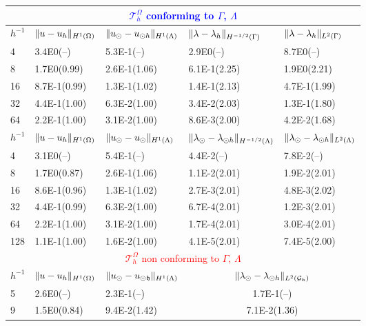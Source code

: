\documentclass[r]{siamart171218}
\begin{document}
\begin{table}
  \scriptsize{
  \begin{center}
    \begin{tabular}{l|llll}
\hline
\multicolumn{5}{c}{\textcolor{blue}{$\mathcal{T}^{\Omega}_h$ conforming to $\Gamma$, $\Lambda$}}\\
\hline
    $h^{-1}$ & $\lVert{u-u_h}\rVert_{H^1(\Omega)}$ & $\lVert{u_{\odot}-u_{\odot h}}\rVert_{H^1(\Lambda)}$ & $\lVert{\lambda-\lambda_h}\rVert_{H^{-1/2}(\Gamma)}$ & $\lVert{\lambda-\lambda_h}\rVert_{L^2(\Gamma)}$\\
      \hline
4  & 3.4E0(--)    & 5.3E-1(--)   & 2.9E0(--)    &8.7E0(--)    \\
8  & 1.7E0(0.99)  & 2.6E-1(1.06) & 6.1E-1(2.25) &1.9E0(2.21)  \\
16 & 8.7E-1(0.99) & 1.3E-1(1.02) & 1.4E-1(2.13) &4.7E-1(1.99) \\
32 & 4.4E-1(1.00) & 6.3E-2(1.00) & 3.4E-2(2.03) &1.3E-1(1.80) \\
64 & 2.2E-1(1.00) & 3.1E-2(1.00) & 8.6E-3(2.00) &4.2E-2(1.68) \\
\hline
$h^{-1}$ & $\lVert{u-u_h}\rVert_{H^1(\Omega)}$ & $\lVert{u_{\odot}-u_{\odot}}\rVert_{H^1(\Lambda)}$ & $\lVert{\lambda_{\odot}-\lambda_{\odot h}}\rVert_{H^{-1/2}(\Lambda)}$ & $\lVert{\lambda_{\odot}-\lambda_{\odot h}}\rVert_{L^2(\Lambda)}$\\
\hline
4   & 3.1E0(--)    & 5.4E-1(--)   & 4.4E-2(--)   & 7.8E-2(--)  \\
8   & 1.7E0(0.87)  & 2.6E-1(1.06) & 1.1E-2(2.01) & 1.9E-2(2.01)\\
16  & 8.6E-1(0.96) & 1.3E-1(1.02) & 2.7E-3(2.01) & 4.8E-3(2.02)\\
32  & 4.4E-1(0.99) & 6.3E-2(1.00) & 6.7E-4(2.01) & 1.2E-3(2.01)\\
64  & 2.2E-1(1.00) & 3.1E-2(1.00) & 1.7E-4(2.01) & 3.0E-4(2.01)\\
128 & 1.1E-1(1.00) & 1.6E-2(1.00) & 4.1E-5(2.01) & 7.4E-5(2.00)\\
\hline
\multicolumn{5}{c}{\textcolor{red}{$\mathcal{T}^{\Omega}_h$ non conforming to $\Gamma$, $\Lambda$}}\\
\hline
    $h^{-1}$ & $\lVert{u-u_h}\rVert_{H^1(\Omega)}$ & $\lVert{u_{\odot}-u_{\odot\mathfrak{h}}}\rVert_{H^1(\Lambda)}$ & \multicolumn{2}{c}{$\lVert{\lambda_{\odot}-\lambda_{\odot h}}\rVert_{L^2(\mathcal{G}_h)}$}\\
      \hline
5   & 2.6E0(--)    & 2.3E-1(--)   & \multicolumn{2}{c}{1.7E-1(--)} \\ 
9   & 1.5E0(0.84)  & 9.4E-2(1.42) & \multicolumn{2}{c}{7.1E-2(1.36)}\\

\end{tabular}
\end{center}}
\end{table}
\end{document}
